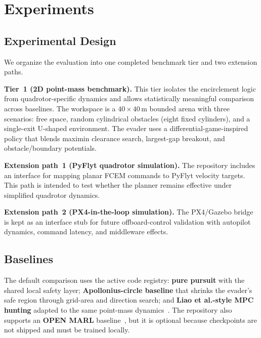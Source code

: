 \documentclass[journal]{IEEEtran}
\begin{document}
\section{Experiments}
\label{sec:experiments}

\subsection{Experimental Design}
\label{sec:exp_design}

We organize the evaluation into one completed benchmark tier and two extension paths.

\textbf{Tier~1 (2D point-mass benchmark).}
This tier isolates the encirclement logic from quadrotor-specific dynamics and allows statistically meaningful comparison across baselines.
The workspace is a $40 \times 40$\,m bounded arena with three scenarios: free space, random cylindrical obstacles (eight fixed cylinders), and a single-exit U-shaped environment.
The evader uses a differential-game-inspired policy that blends maximin clearance search, largest-gap breakout, and obstacle/boundary potentials.

\textbf{Extension path~1 (PyFlyt quadrotor simulation).}
The repository includes an interface for mapping planar FCEM commands to PyFlyt velocity targets.
This path is intended to test whether the planner remains effective under simplified quadrotor dynamics.

\textbf{Extension path~2 (PX4-in-the-loop simulation).}
The PX4/Gazebo bridge is kept as an interface stub for future offboard-control validation with autopilot dynamics, command latency, and middleware effects.

\subsection{Baselines}
\label{sec:baselines}

The default comparison uses the active code registry:
\textbf{pure pursuit} with the shared local safety layer;
\textbf{Apollonius-circle baseline} that shrinks the evader's safe region through grid-area and direction search;
and \textbf{Liao et al.-style MPC hunting} adapted to the same point-mass dynamics~\cite{liao2021}.
The repository also supports an \textbf{OPEN MARL} baseline~\cite{chen2024open}, but it is optional because checkpoints are not shipped and must be trained locally.
\end{document}
